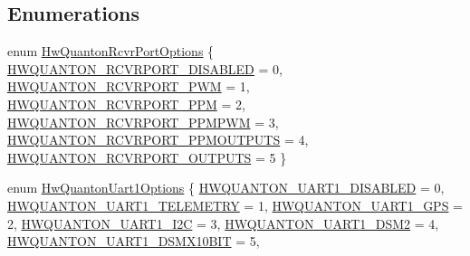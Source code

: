\subsection*{\-Enumerations}
\begin{DoxyCompactItemize}
\item 
enum \hyperlink{group___hw_quanton_ga4724ea4a4930a27b7b5c2d2fa4187ae9}{\-Hw\-Quanton\-Rcvr\-Port\-Options} \{ \*
\hyperlink{group___hw_quanton_gga4724ea4a4930a27b7b5c2d2fa4187ae9ae63e7fbec28c8b66c1fd75d6265fe8d5}{\-H\-W\-Q\-U\-A\-N\-T\-O\-N\-\_\-\-R\-C\-V\-R\-P\-O\-R\-T\-\_\-\-D\-I\-S\-A\-B\-L\-E\-D} = 0, 
\hyperlink{group___hw_quanton_gga4724ea4a4930a27b7b5c2d2fa4187ae9a0771a78f72d988bdec17632694e84331}{\-H\-W\-Q\-U\-A\-N\-T\-O\-N\-\_\-\-R\-C\-V\-R\-P\-O\-R\-T\-\_\-\-P\-W\-M} = 1, 
\hyperlink{group___hw_quanton_gga4724ea4a4930a27b7b5c2d2fa4187ae9a217b54f808d5a4d59c04dd1aa9fbaf98}{\-H\-W\-Q\-U\-A\-N\-T\-O\-N\-\_\-\-R\-C\-V\-R\-P\-O\-R\-T\-\_\-\-P\-P\-M} = 2, 
\hyperlink{group___hw_quanton_gga4724ea4a4930a27b7b5c2d2fa4187ae9a92f9b68fd2d32c373f85a1a5682711f9}{\-H\-W\-Q\-U\-A\-N\-T\-O\-N\-\_\-\-R\-C\-V\-R\-P\-O\-R\-T\-\_\-\-P\-P\-M\-P\-W\-M} = 3, 
\*
\hyperlink{group___hw_quanton_gga4724ea4a4930a27b7b5c2d2fa4187ae9a086ce96ef17e88752c806a95d2da4f58}{\-H\-W\-Q\-U\-A\-N\-T\-O\-N\-\_\-\-R\-C\-V\-R\-P\-O\-R\-T\-\_\-\-P\-P\-M\-O\-U\-T\-P\-U\-T\-S} = 4, 
\hyperlink{group___hw_quanton_gga4724ea4a4930a27b7b5c2d2fa4187ae9a8e1975c561d3a78cf11af44043e7fb11}{\-H\-W\-Q\-U\-A\-N\-T\-O\-N\-\_\-\-R\-C\-V\-R\-P\-O\-R\-T\-\_\-\-O\-U\-T\-P\-U\-T\-S} = 5
 \}
\item 
enum \hyperlink{group___hw_quanton_ga97bd85bdf371400de1a3da93ebe143a8}{\-Hw\-Quanton\-Uart1\-Options} \{ \*
\hyperlink{group___hw_quanton_gga97bd85bdf371400de1a3da93ebe143a8a4bf974fe7d86ebe83d2361fe42600b62}{\-H\-W\-Q\-U\-A\-N\-T\-O\-N\-\_\-\-U\-A\-R\-T1\-\_\-\-D\-I\-S\-A\-B\-L\-E\-D} = 0, 
\hyperlink{group___hw_quanton_gga97bd85bdf371400de1a3da93ebe143a8aa37e1f7bfd4b2e6710f56d56d141c5eb}{\-H\-W\-Q\-U\-A\-N\-T\-O\-N\-\_\-\-U\-A\-R\-T1\-\_\-\-T\-E\-L\-E\-M\-E\-T\-R\-Y} = 1, 
\hyperlink{group___hw_quanton_gga97bd85bdf371400de1a3da93ebe143a8a14d2f1a717bb719fe465ac421ba3f19d}{\-H\-W\-Q\-U\-A\-N\-T\-O\-N\-\_\-\-U\-A\-R\-T1\-\_\-\-G\-P\-S} = 2, 
\hyperlink{group___hw_quanton_gga97bd85bdf371400de1a3da93ebe143a8af8a07e31bcc708f0b13486f569c352d9}{\-H\-W\-Q\-U\-A\-N\-T\-O\-N\-\_\-\-U\-A\-R\-T1\-\_\-\-I2\-C} = 3, 
\*
\hyperlink{group___hw_quanton_gga97bd85bdf371400de1a3da93ebe143a8a1099d68a1ad4bdacd4fa97c318c15f47}{\-H\-W\-Q\-U\-A\-N\-T\-O\-N\-\_\-\-U\-A\-R\-T1\-\_\-\-D\-S\-M2} = 4, 
\hyperlink{group___hw_quanton_gga97bd85bdf371400de1a3da93ebe143a8a751e25cd0423a44ece14972ee1e3423d}{\-H\-W\-Q\-U\-A\-N\-T\-O\-N\-\_\-\-U\-A\-R\-T1\-\_\-\-D\-S\-M\-X10\-B\-I\-T} = 5, 

\end{DoxyCompactItemize}
